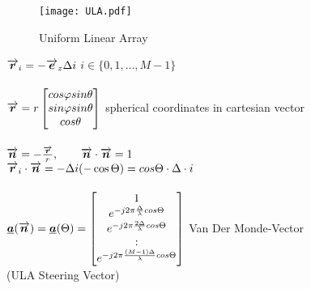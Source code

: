 \begin{figure}[H]
	\centering
	\texttt{[image: ULA.pdf]}
	\caption{Uniform Linear Array}
	\label{ula} 
\end{figure}
\begin{doublespace}
$\overrightarrow{\boldsymbol {r}}_i = -\overrightarrow{\boldsymbol {e}}_z \Delta i$ \qquad $i \in \{0,1,...,M-1\}$\\ \\
$\overrightarrow{\boldsymbol {r}}= r \begin{bmatrix}
cos \varphi sin \theta\\ sin \varphi sin \theta \\ cos \theta
\end{bmatrix}$ \qquad spherical coordinates in cartesian vector  \\ \\
$\overrightarrow{\boldsymbol {n}}=-\frac{\overrightarrow{\boldsymbol {r}}}{r}, \qquad \overrightarrow{\boldsymbol {n}}\cdot \overrightarrow{\boldsymbol {n}}=1$\\
$\overrightarrow{\boldsymbol {r}}_i\cdot\overrightarrow{\boldsymbol {n}}= - \Delta i (-\cos \Theta)= cos\Theta \cdot\Delta\cdot i$\\ \\ 
$\underline{\boldsymbol {a}}(\overrightarrow{\boldsymbol {n}})= \underline{\boldsymbol {a}}(\Theta)= \begin{bmatrix}1 \\ e^{-j2\pi \frac{\Delta}{\lambda}cos \Theta}\\e^{-j2\pi \frac{2\Delta}{\lambda}cos \Theta}\\ : \\ e^{-j2\pi \frac{(M-1)\Delta}{\lambda}cos \Theta} \end{bmatrix}$ \qquad \pfeil Van Der Monde-Vector\\ (ULA Steering Vector)\\ \\
\end{doublespace}

